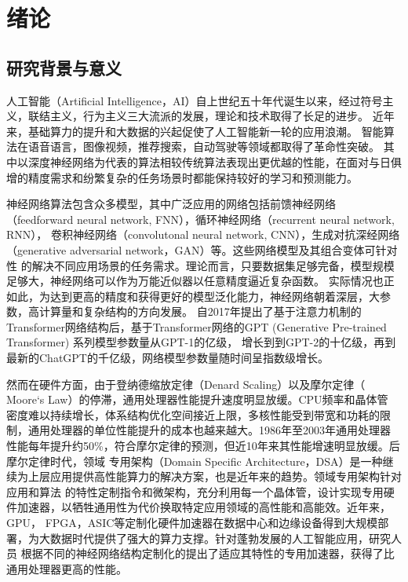 \chapter{绪\hspace{6pt}论}

\section{研究背景与意义}
人工智能（Artificial Intelligence，AI）自上世纪五十年代诞生以来，经过符号主义，联结主义，行为主义三大流派的发展，理论和技术取得了长足的进步。
近年来，基础算力的提升和大数据的兴起促使了人工智能新一轮的应用浪潮。
智能算法在语音语言，图像视频，推荐搜索，自动驾驶等领域都取得了革命性突破。
其中以深度神经网络为代表的算法相较传统算法表现出更优越的性能，在面对与日俱增的精度需求和纷繁复杂的任务场景时都能保持较好的学习和预测能力。

神经网络算法包含众多模型，其中广泛应用的网络包括前馈神经网络（feedforward neural network, FNN），循环神经网络（recurrent neural network, RNN），
卷积神经网络（convolutonal neural network, CNN），生成对抗深经网络（generative adversarial network，GAN）等。这些网络模型及其组合变体可针对性
的解决不同应用场景的任务需求。理论而言，只要数据集足够完备，模型规模足够大，神经网络可以作为万能近似器以任意精度逼近复杂函数。
实际情况也正如此，为达到更高的精度和获得更好的模型泛化能力，神经网络朝着深层，大参数，高计算量和复杂结构的方向发展。
自2017年提出了基于注意力机制的Transformer网络结构后，基于Transformer网络的GPT (Generative Pre-trained Transformer) 系列模型参数量从GPT-1的亿级，
增长到到GPT-2的十亿级，再到最新的ChatGPT的千亿级，网络模型参数量随时间呈指数级增长。

然而在硬件方面，由于登纳德缩放定律（Denard Scaling）以及摩尔定律（ Moore‘s Law）的停滞，通用处理器性能提升速度明显放缓。CPU频率和晶体管
密度难以持续增长，体系结构优化空间接近上限，多核性能受到带宽和功耗的限制，通用处理器的单位性能提升的成本也越来越大。1986年至2003年通用处理器
性能每年提升约50\%，符合摩尔定律的预测，但近10年来其性能增速明显放缓。后摩尔定律时代，领域
专用架构（Domain Specific Architecture，DSA）是一种继续为上层应用提供高性能算力的解决方案，也是近年来的趋势。领域专用架构针对应用和算法
的特性定制指令和微架构，充分利用每一个晶体管，设计实现专用硬件加速器，以牺牲通用性为代价换取特定应用领域的高性能和高能效。近年来，GPU，
FPGA，ASIC等定制化硬件加速器在数据中心和边缘设备得到大规模部署，为大数据时代提供了强大的算力支撑。针对蓬勃发展的人工智能应用，研究人员
根据不同的神经网络结构定制化的提出了适应其特性的专用加速器，获得了比通用处理器更高的性能。

